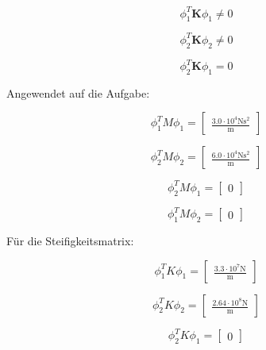 \documentclass[
  letterpaper,
  DIV=11]{scrreprt}
\begin{document}
\[\phi_1^T \mathbf{ K } \phi_1 \neq 0\]

\[\phi_2^T \mathbf{ K } \phi_2 \neq 0\]

\[\phi_2^T \mathbf{ K } \phi_1 = 0\]

Angewendet auf die Aufgabe:

\begin{equation*}\phi_{1}^{T} M \phi_{1} = \left[\begin{matrix}\frac{3.0 \cdot 10^{4} \text{N} \text{s}^{2}}{\text{m}}\end{matrix}\right]\end{equation*}

\begin{equation*}\phi_{2}^{T} M \phi_{2} = \left[\begin{matrix}\frac{6.0 \cdot 10^{4} \text{N} \text{s}^{2}}{\text{m}}\end{matrix}\right]\end{equation*}

\begin{equation*}\phi_{2}^{T} M \phi_{1} = \left[\begin{matrix}0\end{matrix}\right]\end{equation*}

\begin{equation*}\phi_{1}^{T} M \phi_{2} = \left[\begin{matrix}0\end{matrix}\right]\end{equation*}

Für die Steifigkeitsmatrix:

\begin{equation*}\phi_{1}^{T} K \phi_{1} = \left[\begin{matrix}\frac{3.3 \cdot 10^{7} \text{N}}{\text{m}}\end{matrix}\right]\end{equation*}

\begin{equation*}\phi_{2}^{T} K \phi_{2} = \left[\begin{matrix}\frac{2.64 \cdot 10^{8} \text{N}}{\text{m}}\end{matrix}\right]\end{equation*}

\begin{equation*}\phi_{2}^{T} K \phi_{1} = \left[\begin{matrix}0\end{matrix}\right]\end{equation*}
\end{document}
